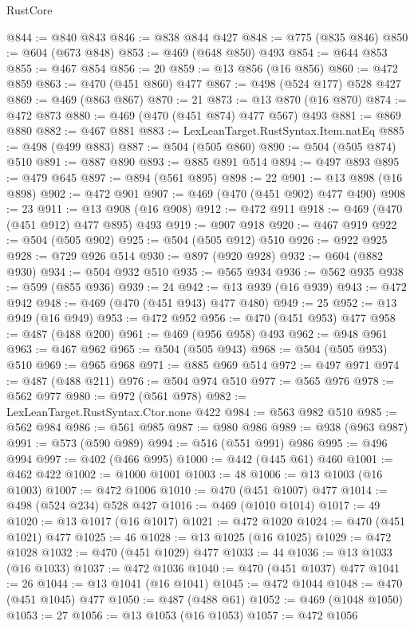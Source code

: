 \begin{lexlean}{RustCore}
\begin{coremodule}
@844 := @840 @843
@846 := @838 @844 @427
@848 := @775 (@835 @846)
@850 := @604 (@673 @848)
@853 := @469 (@648 @850) @493
@854 := @644 @853
@855 := @467 @854
@856 := 20
@859 := @13 @856 (@16 @856)
@860 := @472 @859
@863 := @470 (@451 @860) @477
@867 := @498 (@524 @177) @528 @427
@869 := @469 (@863 @867)
@870 := 21
@873 := @13 @870 (@16 @870)
@874 := @472 @873
@880 := @469 (@470 (@451 @874) @477 @567) @493
@881 := @869 @880
@882 := @467 @881
@883 := LexLeanTarget.RustSyntax.Item.natEq
@885 := @498 (@499 @883)
@887 := @504 (@505 @860)
@890 := @504 (@505 @874) @510
@891 := @887 @890
@893 := @885 @891 @514
@894 := @497 @893
@895 := @479 @645
@897 := @894 (@561 @895)
@898 := 22
@901 := @13 @898 (@16 @898)
@902 := @472 @901
@907 := @469 (@470 (@451 @902) @477 @490)
@908 := 23
@911 := @13 @908 (@16 @908)
@912 := @472 @911
@918 := @469 (@470 (@451 @912) @477 @895) @493
@919 := @907 @918
@920 := @467 @919
@922 := @504 (@505 @902)
@925 := @504 (@505 @912) @510
@926 := @922 @925
@928 := @729 @926 @514
@930 := @897 (@920 @928)
@932 := @604 (@882 @930)
@934 := @504 @932 @510
@935 := @565 @934
@936 := @562 @935
@938 := @599 (@855 @936)
@939 := 24
@942 := @13 @939 (@16 @939)
@943 := @472 @942
@948 := @469 (@470 (@451 @943) @477 @480)
@949 := 25
@952 := @13 @949 (@16 @949)
@953 := @472 @952
@956 := @470 (@451 @953) @477
@958 := @487 (@488 @200)
@961 := @469 (@956 @958) @493
@962 := @948 @961
@963 := @467 @962
@965 := @504 (@505 @943)
@968 := @504 (@505 @953) @510
@969 := @965 @968
@971 := @885 @969 @514
@972 := @497 @971
@974 := @487 (@488 @211)
@976 := @504 @974 @510
@977 := @565 @976
@978 := @562 @977
@980 := @972 (@561 @978)
@982 := LexLeanTarget.RustSyntax.Ctor.none @422
@984 := @563 @982 @510
@985 := @562 @984
@986 := @561 @985
@987 := @980 @986
@989 := @938 (@963 @987)
@991 := @573 (@590 @989)
@994 := @516 (@551 @991) @986
@995 := @496 @994
@997 := @402 (@466 @995)
@1000 := @442 (@445 @61) @460
@1001 := @462 @422
@1002 := @1000 @1001
@1003 := 48
@1006 := @13 @1003 (@16 @1003)
@1007 := @472 @1006
@1010 := @470 (@451 @1007) @477
@1014 := @498 (@524 @234) @528 @427
@1016 := @469 (@1010 @1014)
@1017 := 49
@1020 := @13 @1017 (@16 @1017)
@1021 := @472 @1020
@1024 := @470 (@451 @1021) @477
@1025 := 46
@1028 := @13 @1025 (@16 @1025)
@1029 := @472 @1028
@1032 := @470 (@451 @1029) @477
@1033 := 44
@1036 := @13 @1033 (@16 @1033)
@1037 := @472 @1036
@1040 := @470 (@451 @1037) @477
@1041 := 26
@1044 := @13 @1041 (@16 @1041)
@1045 := @472 @1044
@1048 := @470 (@451 @1045) @477
@1050 := @487 (@488 @61)
@1052 := @469 (@1048 @1050)
@1053 := 27
@1056 := @13 @1053 (@16 @1053)
@1057 := @472 @1056

\end{coremodule}
\end{lexlean}
